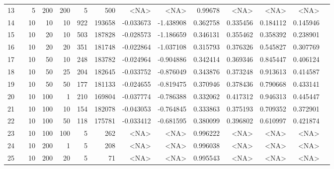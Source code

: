 \begin{longtable}{llrrrrrrrrrrrr}
		13  & &            5 &               200 &          200 &              5 &        500 &      <NA> &      <NA> &   0.99678 &        <NA> &           <NA> &      <NA> \\
		14  & &           10 &                10 &           10 &         922 &     193658 & -0.033673 & -1.438908 &  0.362758 &    0.335456 &       0.184112 &  0.145946 \\
		15  & &           10 &                20 &           10 &         503 &     187828 & -0.028573 & -1.186659 &  0.346131 &    0.355462 &       0.358392 &  0.238901 \\
		16  & &           10 &                20 &           20 &         351 &     181748 & -0.022864 & -1.037108 &  0.315793 &    0.376326 &       0.545827 &  0.307769 \\
		17  & &           10 &                50 &           10 &         248 &     183782 & -0.024964 & -0.904886 &  0.342414 &    0.369346 &       0.845447 &  0.406124 \\
		18  & &           10 &                50 &           25 &         204 &     182645 & -0.033752 & -0.876049 &  0.343876 &    0.373248 &       0.913613 &  0.414587 \\
		19  & &           10 &                50 &           50 &         177 &     181133 & -0.024655 & -0.819475 &  0.370946 &    0.378436 &       0.790668 &  0.433141 \\
		20  & &           10 &               100 &            1 &         210 &     169804 & -0.037774 & -0.786388 &  0.332062 &    0.417312 &       0.946313 &  0.445447 \\
		21  & &           10 &               100 &           10 &         154 &     182078 & -0.043053 & -0.764845 &  0.333863 &    0.375193 &       0.709352 &  0.372901 \\
		22  & &           10 &               100 &           50 &         118 &     175781 & -0.033412 & -0.681595 &  0.380099 &    0.396802 &       0.610997 &  0.421874 \\
		23  & &           10 &               100 &          100 &              5 &        262 &      <NA> &      <NA> &  0.996222 &        <NA> &           <NA> &      <NA> \\
		24  & &           10 &               200 &            1 &              5 &        208 &      <NA> &      <NA> &  0.996038 &        <NA> &           <NA> &      <NA> \\
		25  & &           10 &               200 &           20 &              5 &         71 &      <NA> &      <NA> &  0.995543 &        <NA> &           <NA> &      <NA> \\

\end{longtable}
